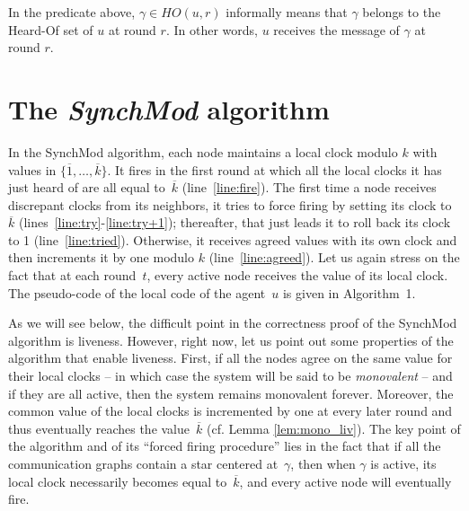 \documentclass{article}
\newcommand{\cent}{\gamma}
\begin{document}
In the predicate above, $\cent \in HO(u,r)$ informally means that $\cent$ belongs to the Heard-Of set of $u$ at round $r$. In other words, $u$ receives the message of $\cent$ at round $r$.

\section{The \textit{SynchMod} algorithm}

In the SynchMod algorithm, each node  maintains a local clock modulo $k$ with values in $\{ \overline{1}, \dots,  \overline{k} \}$.
It fires in the first round at which all the local clocks it has just heard of  are all equal to~$\overline{k} $ (line~\ref{line:fire}).
The first time a node receives discrepant clocks from its neighbors, it tries to force firing  by setting its clock to  $\overline{k} $
	(lines~\ref{line:try}-\ref{line:try+1});
	thereafter, that  just leads it to roll back its clock to 1 (line~\ref{line:tried}).
Otherwise, it receives agreed values with its own clock and then increments it by one modulo $k$ (line~\ref{line:agreed}).
Let us again stress on the fact that at each round~$t$, every active node receives the value of its local clock.
The pseudo-code of the local code of the agent~$u$ is given in Algorithm~1.

As we will see below, the difficult point in the correctness proof of the SynchMod algorithm is liveness.
However, right now, let us point out some properties of the algorithm that enable liveness.
First, if all the nodes  agree on the same value for their local clocks 
	-- in which case the system will be said to be \emph{monovalent} -- and if they are all active, 
	then the system remains monovalent forever.
Moreover, the common value of the local clocks is incremented by one at every later round and thus eventually 
	reaches the value~$\overline{k} $ (cf. Lemma \ref{lem:mono_liv}).
The key point of the algorithm and of its ``forced firing procedure'' lies in the fact that if all the communication graphs  
	contain a star centered at~$\cent$, then when  $\cent$ is active, its local clock necessarily becomes equal 
	to~$\overline{k}$, and every active node will eventually fire. 

\end{document}
